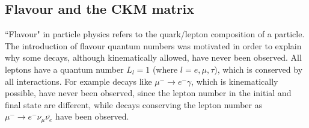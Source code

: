 %
%
%
%
%
%
%
%
%





\subsection{Flavour and the CKM matrix}

``Flavour" in particle physics refers to the quark/lepton composition of a particle. The introduction of flavour quantum numbers
was motivated in order to explain why some decays, although kinematically allowed, have never been observed. All leptons have a
quantum number $L_l = 1$ (where $l = e,\mu,\tau$), which is conserved by all interactions. For example decays
like $\mu^- \rightarrow e^- \gamma $, which is kinematically possible, have never been observed, since the lepton number
in the initial and final state are different, while decays conserving the lepton number as
$\mu^- \rightarrow e^- \nu_\mu \bar{\nu_e}$ have been observed.

